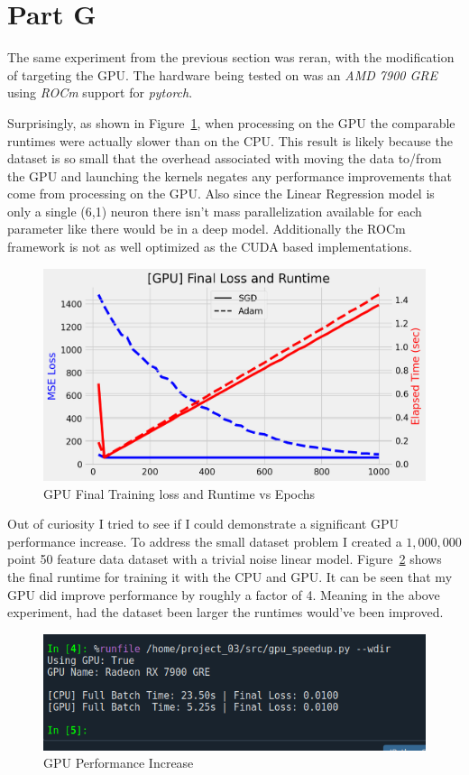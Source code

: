 \newpage
\section{Part G}
\label{sec:sec_g}

The same experiment from the previous section was reran, with the modification of targeting the GPU. The hardware being tested on was an \textit{AMD 7900 GRE} using \textit{ROCm} support for \textit{pytorch}.


Surprisingly, as shown in Figure~\ref{fig:g}, when processing on the GPU the comparable runtimes were actually slower than on the CPU. This result is likely because the dataset is so small that the overhead associated with moving the data to/from the GPU and launching the kernels negates any performance improvements that come from processing on the GPU. Also since the Linear Regression model is only a single (6,1) neuron there isn't mass parallelization available for each parameter like there would be in a deep model. Additionally the ROCm framework is not as well optimized as the CUDA based implementations.

\begin{figure}[htpb]
	\centering
	\includegraphics[width=\columnwidth]{figures/gpu_timing.png}
	\caption{GPU Final Training loss and Runtime vs Epochs}
	\label{fig:g}
\end{figure}

Out of curiosity I tried to see if I could demonstrate a significant GPU performance increase. To address the small dataset problem I created a $1,000,000$ point 50 feature data dataset with a trivial noise linear model. Figure~\ref{fig:g speedup} shows the final runtime for training it with the CPU and GPU. It can be seen that my GPU did improve performance by roughly a factor of 4. Meaning in the above experiment, had the dataset been larger the runtimes would've been improved.  

\begin{figure}[htpb]
	\centering
	\includegraphics[width=\columnwidth]{figures/gpu_speedup.png}
	\caption{GPU Performance Increase}
	\label{fig:g speedup}
\end{figure}

